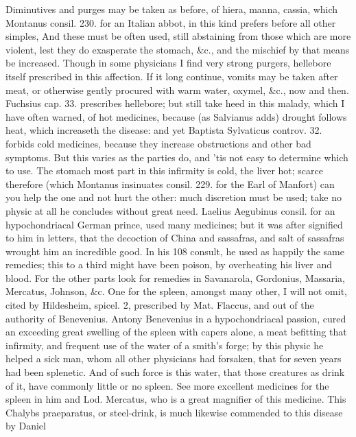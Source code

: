 Diminutives and purges may be taken as before, of hiera, manna,
cassia, which Montanus consil. 230. for an Italian abbot, in this kind
prefers before all other simples, And these must be often used,
still abstaining from those which are more violent, lest they do
exasperate the stomach, \&c., and the mischief by that means be
increased. Though in some physicians I find very strong purgers,
hellebore itself prescribed in this affection. If it long continue,
vomits may be taken after meat, or otherwise gently procured with warm
water, oxymel, \&c., now and then. Fuchsius cap. 33. prescribes
hellebore; but still take heed in this malady, which I have often
warned, of hot medicines, because (as Salvianus adds) drought
follows heat, which increaseth the disease: and yet Baptista Sylvaticus
controv. 32. forbids cold medicines,  because they increase
obstructions and other bad symptoms. But this varies as the parties do,
and 'tis not easy to determine which to use. The stomach most
part in this infirmity is cold, the liver hot; scarce therefore (which
Montanus insinuates consil. 229. for the Earl of Manfort) can you help
the one and not hurt the other: much discretion must be used; take no
physic at all he concludes without great need. Laelius Aegubinus
consil. for an hypochondriacal German prince, used many medicines; but
it was after signified to him in letters, that the decoction of
China and sassafras, and salt of sassafras wrought him an incredible
good. In his 108 consult, he used as happily the same remedies; this to
a third might have been poison, by overheating his liver and blood.
For the other parts look for remedies in Savanarola, Gordonius,
Massaria, Mercatus, Johnson, \&c. One for the spleen, amongst many
other, I will not omit, cited by Hildesheim, spicel. 2, prescribed by
Mat. Flaccus, and out of the authority of Benevenius. Antony Benevenius
in a hypochondriacal passion, cured an exceeding great swelling
of the spleen with capers alone, a meat befitting that infirmity, and
frequent use of the water of a smith's forge; by this physic he helped
a sick man, whom all other physicians had forsaken, that for seven
years had been splenetic. And of such force is this water, that
those creatures as drink of it, have commonly little or no spleen. See
more excellent medicines for the spleen in him and Lod. Mercatus,
who is a great magnifier of this medicine. This Chalybs praeparatus, or
steel-drink, is much likewise commended to this disease by Daniel
